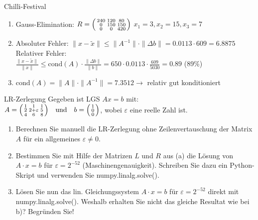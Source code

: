 \begin{example2}{Chilli-Festival}
\begin{enumerate}
    \item Gauss-Elimination:
    $R = \begin{psmallmatrix}
    240 & 120 & 80\\
    0 & 150 & 150\\
    0 & 0 & 420
    \end{psmallmatrix}$
     $x_1 = 3, x_2 = 15, x_3 = 7$
    
    \item Absoluter Fehler: $\|x - \tilde{x}\| \leq \|A^{-1}\| \cdot \|\Delta b\| = 0.0113 \cdot 609 = 6.8875$\\
    Relativer Fehler:\\ $\frac{\|x - \tilde{x}\|}{\|x\|} \leq \text{cond}(A) \cdot \frac{\|\Delta b\|}{\|b\|} = 650 \cdot 0.0113 \cdot \frac{609}{5030} = 0.89$ (89\%)
    
    \item $\text{cond}(A) = \|A\| \cdot \|A^{-1}\| = 7.3512 \rightarrow$
    relativ gut konditioniert
\end{enumerate}
\end{example2}

\begin{example2}{LR-Zerlegung}
Gegeben ist LGS $Ax = b$ mit:\\
$A = \begin{psmallmatrix}
1 & 1 & 1\\
2 & 2+\varepsilon & 5\\
4 & 6 & 8
\end{psmallmatrix}
\quad \text{und} \quad
b = \begin{psmallmatrix}
1\\
0\\
0
\end{psmallmatrix}$,
wobei $\varepsilon$ eine reelle Zahl ist.
\begin{enumerate}
    \item Berechnen Sie manuell die LR-Zerlegung ohne Zeilenvertauschung der Matrix $A$ für ein allgemeines $\varepsilon \neq 0$.
    
    \item Bestimmen Sie mit Hilfe der Matrizen $L$ und $R$ aus (a) die Lösung von $A \cdot x = b$ für $\varepsilon = 2^{-52}$ (Maschinengenauigkeit). Schreiben Sie dazu ein Python-Skript und verwenden Sie numpy.linalg.solve().
    
    \item Lösen Sie nun das lin. Gleichungssystem $A \cdot x = b$ für $\varepsilon = 2^{-52}$ direkt mit numpy.linalg.solve(). Weshalb erhalten Sie nicht das gleiche Resultat wie bei b)? Begründen Sie!
\end{enumerate}
\end{example2}

